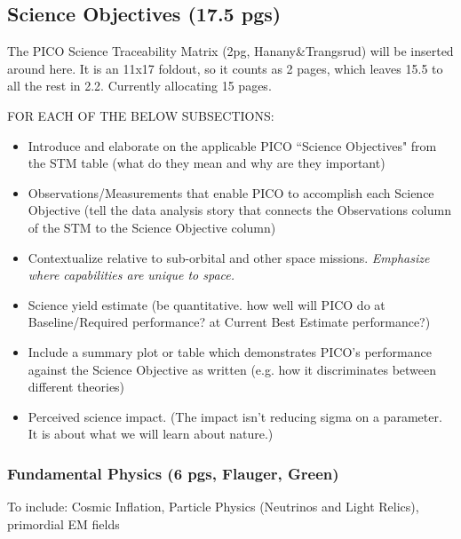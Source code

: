 \documentclass[12pt]{article}
\begin{document}
      

\subsection{Science Objectives (17.5 pgs) } 

  The PICO Science Traceability Matrix (2pg, Hanany\&Trangsrud) will be inserted around here.  It is an 11x17 foldout, so it counts as 2 pages, which leaves 15.5 to all the rest in 2.2. Currently allocating 15 pages.  
    
    \vspace{12pt}
     FOR EACH OF THE BELOW SUBSECTIONS:
    \begin{itemize}
    \item Introduce and elaborate on the applicable PICO ``Science Objectives" from the STM table (what do they mean and why are they important)
    \item Observations/Measurements that enable PICO to accomplish each Science Objective (tell the data analysis story that connects the Observations column of the STM to the Science Objective column)
    \item Contextualize relative to sub-orbital and other space missions. {\it Emphasize where capabilities are unique to space.}
    \item Science yield estimate (be quantitative. how well will PICO do at Baseline/Required performance? at Current Best Estimate performance?)
    \item Include a summary plot or table which demonstrates PICO's performance against the Science Objective as written (e.g. how it discriminates between different theories) 
    \item Perceived science impact. (The impact isn't reducing sigma on a parameter.  It is about what we will learn about nature.)
    \end{itemize}


\subsubsection{Fundamental Physics (6 pgs, Flauger, Green)}


To include: Cosmic Inflation, Particle Physics (Neutrinos and Light Relics), primordial EM fields
\end{document}
